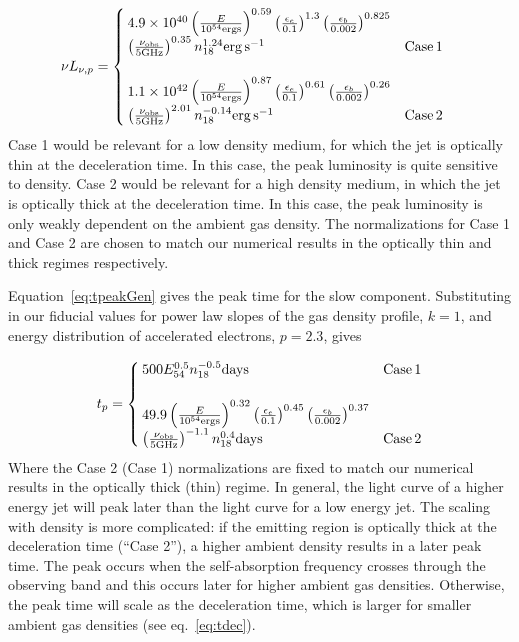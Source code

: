 \documentclass[usenatbib,fleqn]{mnras}
\begin{document}
\begin{align}
\nu L_{\nu, p}&=
\begin{cases}
  4.9\times 10^{40} \left(\frac{E}{10^{54} {\rm ergs}}\right)^{0.59}
  \left(\frac{\epsilon_e}{0.1}\right)^{1.3}
  \left(\frac{\epsilon_b}{0.002}\right)^{0.825}\\
  \left(\frac{\nu_{\rm obs}}{5 {\rm GHz}}\right)^{0.35} n_{18}^{1.24} 
  {\rm erg \, s^{-1}} & {\rm Case \,1}\\\\
 1.1 \times 10^{42}  \left(\frac{E}{10^{54} {\rm ergs}}\right)^{0.87}
  \left(\frac{\epsilon_e}{0.1}\right)^{0.61}
  \left(\frac{\epsilon_b}{0.002}\right)^{0.26}\\
  \left(\frac{\nu_{\rm obs}}{5 {\rm GHz}}\right)^{2.01} n_{18}^{-0.14}
  {\rm erg\, s^{-1}} & {\rm Case \,2}
\end{cases}
\label{eq:peakLum}
\end{align}
%
Case 1 would be relevant for a low density medium, for which the jet is
optically thin at the deceleration time. In this case, the peak
luminosity is quite sensitive to density. Case 2 would be relevant for
a high density medium, in which the jet is optically thick at the
deceleration time. In this case, the peak luminosity is only weakly
dependent on the ambient gas density. The normalizations for Case 1
and Case 2 are chosen to match our numerical results in the optically
thin and thick regimes respectively.

Equation~\eqref{eq:tpeakGen} gives the peak time for the slow
component. Substituting in our fiducial values for power law slopes of
the gas density profile, $k=1$, and energy distribution of accelerated
electrons, $p=2.3$, gives


\begin{align}
t_p=
\begin{cases}
  500 E_{54}^{0.5} n_{18}^{-0.5} {\rm days} & {\rm Case \, 1}\\\\
  49.9 \left(\frac{E}{10^{54} {\rm ergs}}\right)^{0.32}
  \left(\frac{\epsilon_e}{0.1}\right)^{0.45}
  \left(\frac{\epsilon_b}{0.002}\right)^{0.37}\\
  \left(\frac{\nu_{\rm obs}}{5 {\rm GHz}}\right)^{-1.1} n_{18}^{0.4}
  {\rm days}& {\rm Case \, 2}
\end{cases}
\label{eq:peakTime}
\end{align}
%
Where the Case 2 (Case 1) normalizations are fixed to match our
numerical results in the optically thick (thin) regime. In general,
the light curve of a higher energy jet will peak later than the light
curve for a low energy jet. The scaling with density is more
complicated: if the emitting region is optically thick at the
deceleration time (``Case 2''), a higher ambient density results in a
later peak time. The peak occurs when the self-absorption frequency
crosses through the observing band and this occurs later for higher
ambient gas densities. Otherwise, the peak time will scale as the
deceleration time, which is larger for smaller ambient gas densities
(see eq.~\ref{eq:tdec}).
\end{document}
